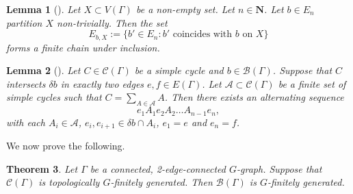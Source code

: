 \documentclass[11pt,a4paper]{amsart}
\newcommand{\N}{\mathbf{N}}
\newtheorem{theorem}{Theorem}[section]%
\newtheorem{lemma}[theorem]{Lemma}
\theoremstyle{definition}
\newcommand{\br}{{\mathscr{B}}}
\newcommand{\cyc}{\mathscr{C}}
\begin{document}
\begin{lemma}[{\cite[Lem.~2.3]{hamann2018accessibility}}]\label{lem:hamann-2.3}
    Let $X \subset V(\Gamma)$ be a non-empty set. Let $n \in \N$. Let $b \in  E _n$ partition $X$ non-trivially. Then the set
    $$
     E _{b, X} := \{b' \in  E _n : \text{$b'$ coincides with $b$ on $X$}\}
    $$
    forms a finite chain under inclusion.
\end{lemma}



\begin{lemma}[{\cite[Lem.~2.4]{hamann2018accessibility}}]\label{lem:hamann-2.4}
    Let $C \in \cyc(\Gamma)$ be a simple cycle and $b \in \br(\Gamma)$. Suppose that $C$ intersects $\delta b$ in exactly two edges $e, f \in E(\Gamma)$. Let $\mathcal A \subset \cyc(\Gamma)$ be a finite set of simple cycles such that $C = \sum_{A \in \mathcal A} A$. Then there exists an alternating sequence 
    $$
    e_1 A_1 e_2A_2 \ldots A_{n-1}e_n,
    $$
    with each $A_i \in \mathcal A$, $e_i, e_{i+1} \in \delta b \cap A_i$, $e_1 = e$ and $e_n = f$. 
\end{lemma}



We now prove the following. 

\begin{theorem}
    Let $\Gamma$ be a connected, 2-edge-connected $G$-graph. Suppose that $\cyc(\Gamma)$ is topologically $G$-finitely generated. Then $\br(\Gamma)$ is $G$-finitely generated. 
\end{theorem}
\end{document}
